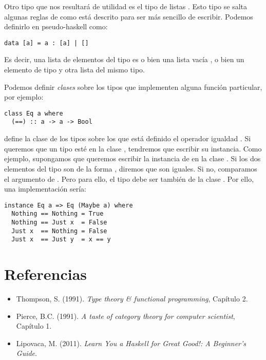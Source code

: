 Otro tipo que nos resultará de utilidad es el tipo de listas \code{[a]}.
Esto tipo se salta algunas reglas de como está descrito para ser más sencillo de escribir.
Podemos definirlo en pseudo-haskell como:
\begin{verbatim}
data [a] = a : [a] | []
\end{verbatim}
Es decir, una lista de elementos del tipo  es o bien una lista vacía \code{[]}, o bien un elemento de tipo  y otra lista del mismo tipo.

Podemos definir \emph{clases} sobre los tipos que implementen alguna función particular, por ejemplo:
\begin{verbatim}
class Eq a where
  (==) :: a -> a -> Bool
\end{verbatim}
define la clase de los tipos sobre los que está definido el operador igualdad \code{(==)}.
Si queremos que un tipo esté en la clase , tendremos que escribir su instancia.
Como ejemplo, supongamos que queremos escribir la instancia de  en la clase .
Si los dos elementos del tipo  son de la forma , diremos que son iguales.
Si no, comparamos el argumento de .
Pero para ello, el tipo  debe ser también de la clase .
Por ello, una implementación sería:
\begin{verbatim}
instance Eq a => Eq (Maybe a) where
  Nothing == Nothing = True
  Nothing == Just x  = False
  Just x  == Nothing = False
  Just x  == Just y  = x == y
\end{verbatim}

\section{Referencias}
\begin{itemize}
  \item Thompson, S. (1991). \emph{Type theory \& functional programming}, Capítulo 2.
  \item Pierce, B.C. (1991). \emph{A taste of category theory for computer scientist}, Capítulo 1.
  \item Lipovaca, M. (2011). \emph{Learn You a Haskell for Great Good!: A Beginner's Guide}.
\end{itemize}